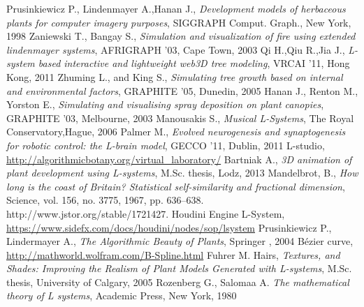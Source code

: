 \documentclass[b5paper,twoside,11pt]{article}
\begin{document}
\fi
\begin{thebibliography}{99}
\small
{}Prusinkiewicz P., Lindenmayer A.,Hanan J.,\textit{ Development models of herbaceous plants for computer imagery purposes},  SIGGRAPH Comput. Graph., New York, 1998
 Zaniewski T., Bangay S., \textit{ Simulation and visualization of fire using extended lindenmayer systems}, AFRIGRAPH '03, Cape Town, 2003
Qi H.,Qiu R.,Jia J., \textit{L-system based interactive and lightweight web3D tree modeling}, VRCAI '11, Hong Kong, 2011
  Zhuming L., and King S., \textit{Simulating tree growth based on internal and environmental factors}, GRAPHITE '05, Dunedin, 2005
Hanan J., Renton M., Yorston E., \textit{Simulating and visualising spray deposition on plant canopies}, GRAPHITE '03, Melbourne, 2003
Manousakis S., \textit{Musical L-Systems}, The Royal Conservatory,Hague, 2006
Palmer M., \textit{Evolved neurogenesis and synaptogenesis for robotic control: the L-brain model}, GECCO '11, Dublin, 2011
L-studio, \url{http://algorithmicbotany.org/virtual_laboratory/}
Bartniak A., \textit{3D animation of plant development using L-systems}, M.Sc. thesis, Lodz, 2013
Mandelbrot, B., \textit{How long is the coast of Britain? Statistical self-similarity and fractional dimension}, Science, vol. 156, no. 3775, 1967, pp. 636–638. http://www.jstor.org/stable/1721427.
Houdini Engine L-System, \url{https://www.sidefx.com/docs/houdini/nodes/sop/lsystem}
Prusinkiewicz P., Lindermayer A., \textit{The Algorithmic Beauty of Plants}, Springer , 2004
Bézier curve, \url {http://mathworld.wolfram.com/B-Spline.html}
Fuhrer M. Hairs, \textit{Textures, and Shades: Improving the Realism of Plant Models Generated with L-systems}, M.Sc. thesis, University of Calgary, 2005
 Rozenberg G., Salomaa A. \textit{The mathematical theory of L systems}, Academic Press, New York, 1980

\end{thebibliography}

\ifdefined\PROCINCLUDED
%
\else
\end{document}

